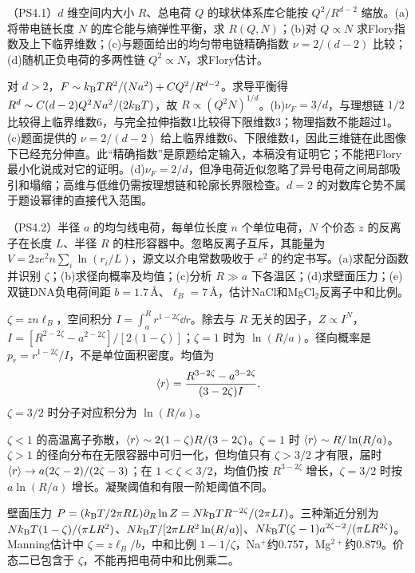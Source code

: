 \begin{exercise}
（PS4.1）$d$ 维空间内大小 $R$、总电荷 $Q$ 的球状体系库仑能按 $Q^2/R^{d-2}$ 缩放。(a)将带电链长度 $N$ 的库仑能与熵弹性平衡，求 $R(Q,N)$；(b)对 $Q\propto N$ 求Flory指数及上下临界维数；(c)与题面给出的均匀带电链精确指数 $\nu=2/(d-2)$ 比较；(d)随机正负电荷的多两性链 $Q^2\propto N$，求Flory估计。
\end{exercise}
\begin{solution}
对 $d>2$，$F\sim k_{\mathrm B} TR^2/(Na^2)+CQ^2/R^{d-2}$。求导平衡得 $R^d\sim C(d-2)Q^2Na^2/(2k_{\mathrm B} T)$，故 $R\propto(Q^2N)^{1/d}$。(b)$\nu_F=3/d$，与理想链 $1/2$ 比较得上临界维数6，与完全拉伸指数1比较得下限维数3；物理指数不能超过1。(c)题面提供的 $\nu=2/(d-2)$ 给上临界维数6、下限维数4，因此三维链在此图像下已经充分伸直。此“精确指数”是原题给定输入，本稿没有证明它；不能把Flory最小化说成对它的证明。(d)$\nu_F=2/d$，但净电荷近似忽略了异号电荷之间局部吸引和塌缩；高维与低维仍需按理想链和轮廓长界限检查。$d=2$ 的对数库仑势不属于题设幂律的直接代入范围。
\end{solution}

\begin{exercise}
（PS4.2）半径 $a$ 的均匀线电荷，每单位长度 $n$ 个单位电荷，$N$ 个价态 $z$ 的反离子在长度 $L$、半径 $R$ 的柱形容器中。忽略反离子互斥，其能量为 $V=2ze^2n\sum_i\ln(r_i/L)$，源文以介电常数吸收于 $e^2$ 的约定书写。(a)求配分函数并识别 $\zeta$；(b)求径向概率及均值；(c)分析 $R\gg a$ 下各温区；(d)求壁面压力；(e)双链DNA负电荷间距 $b=1.7\,\text{\AA}$、$\ell_B=7\,\text{\AA}$，估计NaCl和MgCl$_2$反离子中和比例。
\end{exercise}
\begin{solution}
$\zeta=zn\ell_B$，空间积分 $I=\int_a^Rr^{1-2\zeta}\dd r$。除去与 $R$ 无关的因子，$Z\propto I^N$，$I=[R^{2-2\zeta}-a^{2-2\zeta}]/[2(1-\zeta)]$；$\zeta=1$ 时为 $\ln(R/a)$。径向概率是 $p_r=r^{1-2\zeta}/I$，不是单位面积密度。均值为
\[
\langle r\rangle=\frac{R^{3-2\zeta}-a^{3-2\zeta}}{(3-2\zeta)I},
\]
$\zeta=3/2$ 时分子对应积分为 $\ln(R/a)$。

$\zeta<1$ 的高温离子弥散，$\langle r\rangle\sim2(1-\zeta)R/(3-2\zeta)$。$\zeta=1$ 时 $\langle r\rangle\sim R/\ln(R/a)$。$\zeta>1$ 的径向分布在无限容器中可归一化，但均值只有 $\zeta>3/2$ 才有限，届时 $\langle r\rangle\to a(2\zeta-2)/(2\zeta-3)$；在 $1<\zeta<3/2$，均值仍按 $R^{3-2\zeta}$ 增长，$\zeta=3/2$ 时按 $a\ln(R/a)$ 增长。凝聚阈值和有限一阶矩阈值不同。

壁面压力 $P=(k_{\mathrm B} T/2\pi RL)\partial_R\ln Z=Nk_{\mathrm B} T R^{-2\zeta}/(2\pi LI)$。三种渐近分别为 $Nk_{\mathrm B} T(1-\zeta)/(\pi LR^2)$、$Nk_{\mathrm B} T/[2\pi LR^2\ln(R/a)]$、$Nk_{\mathrm B} T(\zeta-1)a^{2\zeta-2}/(\pi LR^{2\zeta})$。Manning估计中 $\zeta=z\ell_B/b$，中和比例 $1-1/\zeta$，Na$^+$约0.757，Mg$^{2+}$约0.879。价态二已包含于 $\zeta$，不能再把电荷中和比例乘二。
\end{solution}

